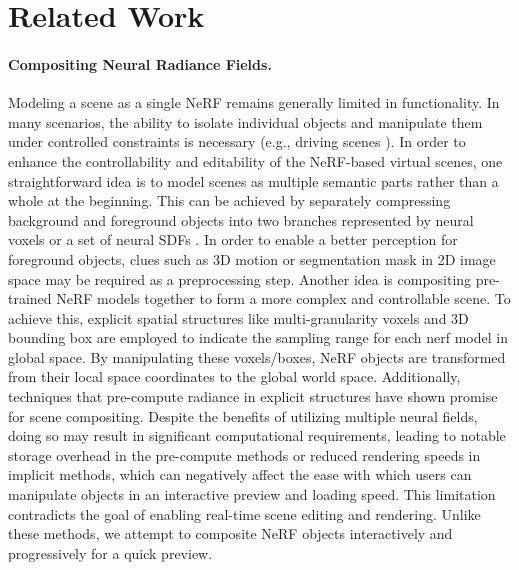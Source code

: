 \documentclass[letterpaper]{article} %
\begin{document}
\section{Related Work}
\paragraph{Compositing Neural Radiance Fields.}
Modeling a scene as a single NeRF remains generally limited in functionality. In many scenarios, the ability to isolate individual objects and manipulate them under controlled constraints is necessary (e.g., driving scenes \cite{krishnan2023lane}). In order to enhance the controllability and editability of the NeRF-based virtual scenes, one straightforward idea is to model scenes as multiple semantic parts rather than a whole at the beginning. This can be achieved by separately compressing background and foreground objects into two branches represented by neural voxels \cite{yang2021learning} or a set of neural SDFs \cite{wu2022object}. In order to enable a better perception for foreground objects, clues such as 3D motion \cite{shuai2022multinb} or segmentation mask \cite{kundu2022panoptic, tancik2022block} in 2D image space may be required as a preprocessing step. Another idea is compositing pre-trained NeRF models together to form a more complex and controllable scene. To achieve this, explicit spatial structures like multi-granularity voxels \cite{liu2020neural} and 3D bounding box \cite{ost2021neural, shuai2022multinb} are employed to indicate the sampling range for each nerf model in global space. By manipulating these voxels/boxes, NeRF objects are transformed from their local space coordinates to the global world space. Additionally, techniques that pre-compute radiance in explicit structures have shown promise for scene compositing. Despite the benefits of utilizing multiple neural fields, doing so may result in significant computational requirements, leading to notable storage overhead in the pre-compute methods or reduced rendering speeds in implicit methods, which can negatively affect the ease with which users can manipulate objects in an interactive preview and loading speed. This limitation contradicts the goal of enabling real-time scene editing and rendering. Unlike these methods, we attempt to composite NeRF objects interactively and progressively for a quick preview.
\end{document}
